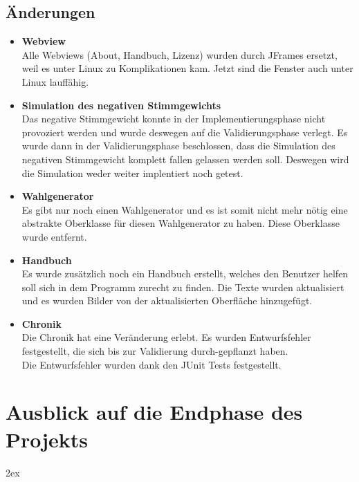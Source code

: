 \documentclass[12pt,a4paper,titlepage]{article}
\begin{document}
\subsection{Änderungen}
\begin{itemize}


\item{\bf{Webview}}\\
Alle Webviews (About, Handbuch, Lizenz) wurden durch JFrames ersetzt, weil es unter Linux zu Komplikationen kam. Jetzt sind die Fenster auch unter Linux lauffähig.\\

\item{\bf{Simulation des negativen Stimmgewichts}}\\
Das negative Stimmgewicht konnte in der Implementierungsphase nicht provoziert werden und wurde deswegen auf die Validierungsphase verlegt. Es wurde dann in der Validierungsphase beschlossen, dass die Simulation des negativen Stimmgewicht komplett fallen gelassen werden soll. Deswegen wird die Simulation weder weiter implentiert noch getest.

\item{\bf{Wahlgenerator}}\\
Es gibt nur noch einen Wahlgenerator und es ist somit nicht mehr nötig eine abstrakte Oberklasse für diesen Wahlgenerator zu haben. Diese Oberklasse wurde entfernt.

\item{\bf{Handbuch}}\\
Es wurde zusätzlich noch ein Handbuch erstellt, welches den Benutzer helfen soll sich in dem Programm zurecht zu finden. Die Texte wurden aktualisiert und es wurden Bilder von der aktualisierten Oberfläche hinzugefügt. 

\item{\bf{Chronik}}\\
Die Chronik hat eine Veränderung erlebt. Es wurden Entwurfsfehler festgestellt, die sich bis zur Validierung durch-gepflanzt haben. \\
Die Entwurfsfehler wurden dank den JUnit Tests festgestellt.

\end{itemize}

\section{Ausblick auf die Endphase des Projekts}


\begingroup
\parindent 0pt
\parskip 2ex
\def\enotesize{\normalsize}

\endgroup
\end{document}
